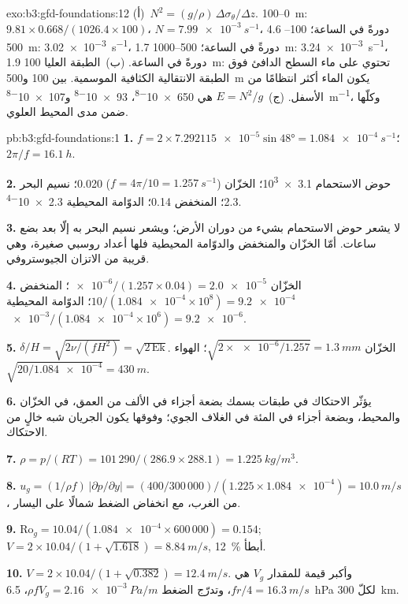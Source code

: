 \begin{solution}{exo:b3:gfd-foundations:12}
(أ)~$N^2 = (g/\rho)\,\Delta\sigma_\theta/\Delta z$. 0--\qty{100}{m}:
$9.81\times0.668/(1026.4\times100)$، $N = \qty{7.99e-3}{s^{-1}}$، 4.6
دورةً في الساعة؛ 100--\qty{500}{m}: \qty{3.02e-3}{s^{-1}}، 1.7 دورةً في
الساعة؛ 500--\qty{1000}{m}: \qty{3.24e-3}{s^{-1}}، 1.9 دورةً في الساعة.
(ب)~الطبقة العليا \qty{100}{m}: تحتوي على ماء السطح الدافئ فوق
الطبقة الانتقالية الكثافية الموسمية. بين 100 و\qty{500}{m} يكون الماء أكثر
انتظامًا من الأسفل. (ج)~$E = N^2/g$ هي \num{650e-8}، \num{93e-8}
و\qty{107e-8}{m^{-1}}، وكلّها ضمن مدى المحيط العلوي.
\end{solution}

\begin{solution}{pb:b3:gfd-foundations:1}
\textbf{1.} $f = 2\times\num{7.292115e-5}\sin\ang{48} =
\qty{1.084e-4}{s^{-1}}$؛ $2\pi/f = \qty{16.1}{h}$.

\textbf{2.} حوض الاستحمام \num{3.1e3}؛ الخزّان ($f = 4\pi/10 = \qty{1.257}{s^{-1}}$)
0.020؛ نسيم البحر 2.3؛ المنخفض 0.14؛ الدوّامة المحيطية \num{2.3e-4}.

\textbf{3.} لا يشعر حوض الاستحمام بشيء من دوران الأرض؛ ويشعر نسيم البحر
به إلّا بعد بضع ساعات. أمّا الخزّان والمنخفض والدوّامة المحيطية فلها
أعداد روسبي صغيرة، وهي قريبة من الاتزان الجيوستروفي.

\textbf{4.} الخزّان $\num{e-6}/(1.257\times0.04) = \num{2.0e-5}$؛ المنخفض
$10/(\num{1.084e-4}\times10^8) = \num{9.2e-4}$؛ الدوّامة المحيطية
$\num{e-3}/(\num{1.084e-4}\times10^6) = \num{9.2e-6}$.

\textbf{5.} $\delta/H = \sqrt{2\nu/(fH^2)} = \sqrt{2\,\mathrm{Ek}}$. الخزّان
$\sqrt{2\times\num{e-6}/1.257} = \qty{1.3}{mm}$؛ الهواء $\sqrt{20/\num{1.084e-4}}
= \qty{430}{m}$.

\textbf{6.} يؤثّر الاحتكاك في طبقات بسمك بضعة أجزاء في الألف من العمق، في
الخزّان والمحيط، وبضعة أجزاء في المئة في الغلاف الجوي؛ وفوقها يكون الجريان
شبه خالٍ من الاحتكاك.

\textbf{7.} $\rho = p/(RT) = 101\,290/(286.9\times288.1) =
\qty{1.225}{kg/m^3}$.

\textbf{8.} $u_g = (1/\rho f)\,|\partial p/\partial y| = (400/300\,000)/(1.225
\times\num{1.084e-4}) = \qty{10.0}{m/s}$، من الغرب، مع انخفاض الضغط
شمالًا على اليسار.

\textbf{9.} $\mathrm{Ro}_g = 10.04/(\num{1.084e-4}\times600\,000) = 0.154$;
$V = 2\times10.04/(1 + \sqrt{1.618}) = \qty{8.84}{m/s}$, \qty{12}{\percent}
أبطأ.

\textbf{10.} $V = 2\times10.04/(1 + \sqrt{0.382}) = \qty{12.4}{m/s}$. وأكبر
قيمة للمقدار $V_g$ هي $fr/4 = \qty{16.3}{m/s}$، وتدرّج الضغط $\rho fV_g =
\qty{2.16e-3}{Pa/m}$، \qty{6.5}{hPa} لكلّ \qty{300}{km}.


\end{solution}
